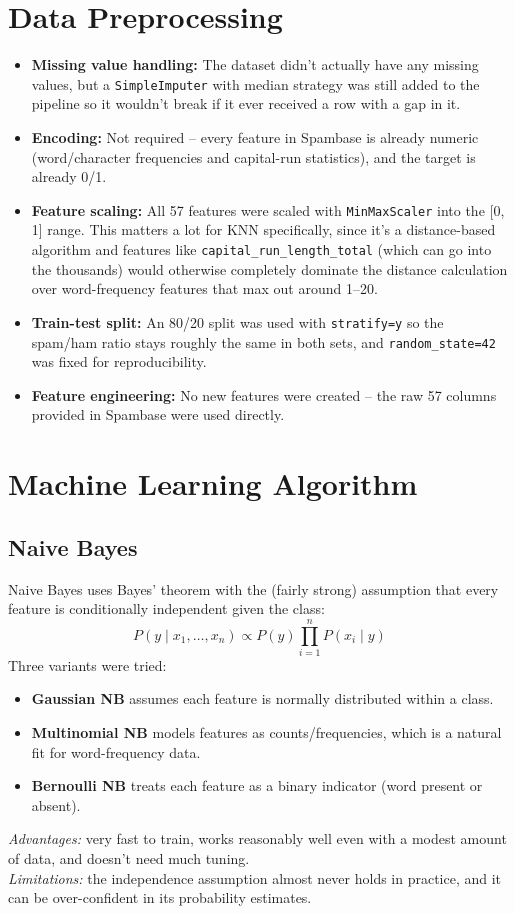 \documentclass[12pt,a4paper]{article}
\begin{document}
\section{Data Preprocessing}

\begin{itemize}
\item \textbf{Missing value handling:} The dataset didn't actually have any missing values, but a \texttt{SimpleImputer} with median strategy was still added to the pipeline so it wouldn't break if it ever received a row with a gap in it.
\item \textbf{Encoding:} Not required -- every feature in Spambase is already numeric (word/character frequencies and capital-run statistics), and the target is already 0/1.
\item \textbf{Feature scaling:} All 57 features were scaled with \texttt{MinMaxScaler} into the [0, 1] range. This matters a lot for KNN specifically, since it's a distance-based algorithm and features like \texttt{capital\_run\_length\_total} (which can go into the thousands) would otherwise completely dominate the distance calculation over word-frequency features that max out around 1--20.
\item \textbf{Train-test split:} An 80/20 split was used with \texttt{stratify=y} so the spam/ham ratio stays roughly the same in both sets, and \texttt{random\_state=42} was fixed for reproducibility.
\item \textbf{Feature engineering:} No new features were created -- the raw 57 columns provided in Spambase were used directly.
\end{itemize}

\section{Machine Learning Algorithm}

\subsection*{Naive Bayes}
Naive Bayes uses Bayes' theorem with the (fairly strong) assumption that every feature is conditionally independent given the class:
\[
P(y \mid x_1, \dots, x_n) \propto P(y) \prod_{i=1}^{n} P(x_i \mid y)
\]
Three variants were tried:
\begin{itemize}
\item \textbf{Gaussian NB} assumes each feature is normally distributed within a class.
\item \textbf{Multinomial NB} models features as counts/frequencies, which is a natural fit for word-frequency data.
\item \textbf{Bernoulli NB} treats each feature as a binary indicator (word present or absent).
\end{itemize}
\textit{Advantages:} very fast to train, works reasonably well even with a modest amount of data, and doesn't need much tuning.\\
\textit{Limitations:} the independence assumption almost never holds in practice, and it can be over-confident in its probability estimates.
\end{document}
